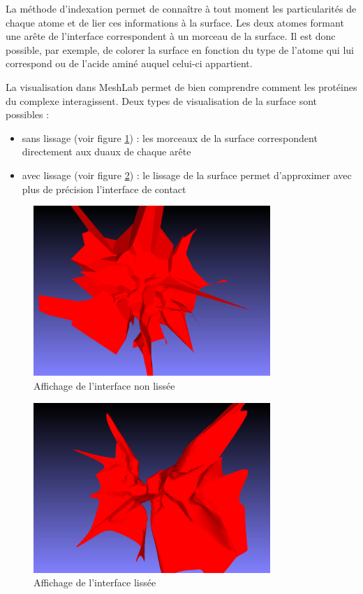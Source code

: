 La méthode d'indexation permet de connaître à tout moment les particularités de chaque
atome et de lier ces informations à la surface. Les deux atomes formant une arête
de l'interface correspondent à un morceau de la surface. Il est donc possible, par exemple,
de colorer la surface en fonction du type de l'atome qui lui correspond ou de l'acide aminé
auquel celui-ci appartient.

La visualisation dans MeshLab permet de bien comprendre comment les protéines du complexe interagissent.
Deux types de visualisation de la surface sont possibles :
\begin{itemize}
  \item sans lissage (voir figure \ref{fig::surf_no_smooth}) : les morceaux de la surface correspondent
  directement aux duaux de chaque arête
  \item avec lissage (voir figure \ref{fig::surf_smooth}) : le lissage de la surface
  permet d'approximer avec plus de précision l'interface de contact
\end{itemize}

\begin{figure}[ht]
\centering
  \includegraphics[width=0.8\textwidth]{figures/surf_no_smooth.png}
  \caption{Affichage de l'interface non lissée}
  \label{fig::surf_no_smooth}
\end{figure}

\begin{figure}[ht]
\centering
  \includegraphics[width=0.8\textwidth]{figures/surf_smooth.png}
  \caption{Affichage de l'interface lissée}
  \label{fig::surf_smooth}
\end{figure}

